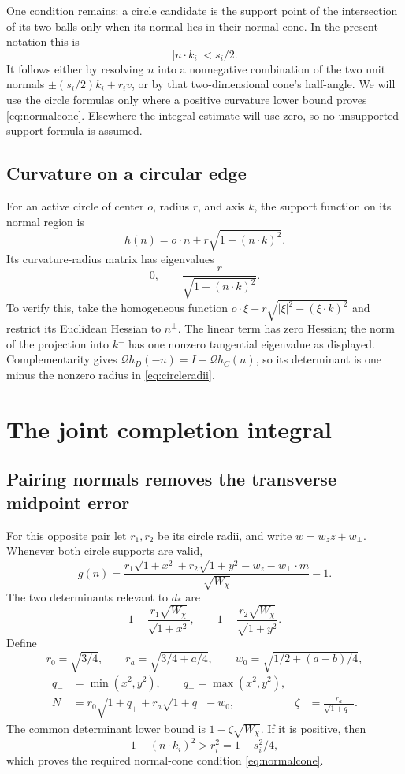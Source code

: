 \documentclass[11pt]{article}
\numberwithin{equation}{section}
\theoremstyle{definition}\newtheorem{definition}[theorem]{Definition}
\theoremstyle{remark}\newtheorem{remark}[theorem]{Remark}
\newcommand{\Qh}{\mathcal Q}
\begin{document}
One condition remains: a circle candidate is the support point of the
intersection of its two balls only when its normal lies in their normal
cone. In the present notation this is
\begin{equation}\label{eq:normalcone}
 |n\cdot k_i|<s_i/2.
\end{equation}
It follows either by resolving $n$ into a nonnegative combination of the
two unit normals $\pm(s_i/2)k_i+r_iv$, or by that two-dimensional cone's
half-angle. We will use the circle formulas only where a positive curvature
lower bound proves \cref{eq:normalcone}. Elsewhere the integral estimate
will use zero, so no unsupported support formula is assumed.

\subsection{Curvature on a circular edge}
For an active circle of center $o$, radius $r$, and axis $k$, the support
function on its normal region is
\[
 h(n)=o\cdot n+r\sqrt{1-(n\cdot k)^2}.
\]
Its curvature-radius matrix has eigenvalues
\begin{equation}\label{eq:circleradii}
 0,\qquad\frac r{\sqrt{1-(n\cdot k)^2}}.
\end{equation}
To verify this, take the homogeneous function
$o\cdot\xi+r\sqrt{|\xi|^2-(\xi\cdot k)^2}$ and restrict its Euclidean
Hessian to $n^\perp$. The linear term has zero Hessian; the norm of the
projection into $k^\perp$ has one nonzero tangential eigenvalue as displayed.
Complementarity gives $\Qh h_D(-n)=I-\Qh h_C(n)$, so its determinant is
one minus the nonzero radius in \cref{eq:circleradii}.

\section{The joint completion integral}\label{sec:jointintegral}
\subsection{Pairing normals removes the transverse midpoint error}
For this opposite pair let $r_1,r_2$ be its circle radii, and write
$w=w_z z+w_\perp$. Whenever both circle supports are valid,
\begin{equation}\label{eq:truegap}
 g(n)=\frac{r_1\sqrt{1+x^2}+r_2\sqrt{1+y^2}-w_z-w_\perp\cdot m}
              {\sqrt{W_\chi}}-1.
\end{equation}
The two determinants relevant to $d_*$ are
\[
 1-\frac{r_1\sqrt{W_\chi}}{\sqrt{1+x^2}},\qquad
 1-\frac{r_2\sqrt{W_\chi}}{\sqrt{1+y^2}}.
\]
Define
\[
 r_0=\sqrt{3/4},\qquad r_a=\sqrt{3/4+a/4},\qquad
 w_0=\sqrt{1/2+(a-b)/4},
\]
\begin{align}
 q_-&=\min(x^2,y^2),\qquad q_+=\max(x^2,y^2),\nonumber\\
 N&=r_0\sqrt{1+q_+}+r_a\sqrt{1+q_-}-w_0,
 &\zeta&=\frac{r_a}{\sqrt{1+q_-}}.\label{eq:Nzeta}
\end{align}
The common determinant lower bound is $1-\zeta\sqrt{W_\chi}$.
If it is positive, then
\[
 1-(n\cdot k_i)^2>r_i^2=1-s_i^2/4,
\]
which proves the required normal-cone condition \cref{eq:normalcone}.
\end{document}
